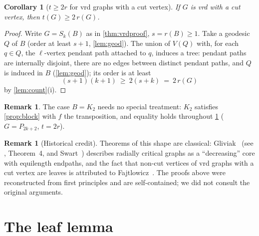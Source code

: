 \documentclass[11pt]{article}
\newtheorem{corollary}[theorem]{Corollary}
\theoremstyle{definition}
\newtheorem{remark}[theorem]{Remark}
\begin{document}
\begin{corollary}[$t\ge 2r$ for vrd graphs with a cut vertex]
\label{cor:vrd-tree}
If $G$ is vrd with a cut vertex, then $t(G)\ge2\,r(G)$.
\end{corollary}

\begin{proof}
Write $G=S_k(B)$ as in \cref{thm:vrdproof}, $s=r(B)\ge1$.
Take a geodesic $Q$ of $B$ (order at least $s+1$,
\cref{lem:geod}).  The union of $V(Q)$ with, for each $q\in Q$, the
$\ell$-vertex pendant path attached to $q$, induces a tree: pendant paths
are internally disjoint, there are no edges between distinct pendant paths,
and $Q$ is induced in $B$ (\cref{lem:geod}); its order is at least
\[
 (s+1)(k+1)\ \ge\ 2(s+k)\ =\ 2\,r(G)
\]
by \cref{lem:count}(i).
\end{proof}

\begin{remark}
The case $B=K_2$ needs no special treatment: $K_2$ satisfies
\cref{prop:block} with $f$ the transposition, and equality holds
throughout \cref{cor:vrd-tree} ($G=P_{2k+2}$, $t=2r$).
\end{remark}

\begin{remark}[Historical credit]
Theorems of this shape are classical: Gliviak~\cite{Gliviak1976} (see
\cite{Gliviak2000}, Theorem~4, and Swart~\cite[Theorem~2.2.10]{Swart1996})
describes radially critical graphs as a ``decreasing'' core with equilength
endpaths, and the fact that non-cut vertices of vrd graphs with a cut vertex
are leaves is attributed to Fajtlowicz~\cite{Fajtlowicz1988}.  The proofs
above were reconstructed from first principles and are self-contained; we
did not consult the original arguments.
\end{remark}

\section{The leaf lemma}\label{sec:leaf}
\end{document}
